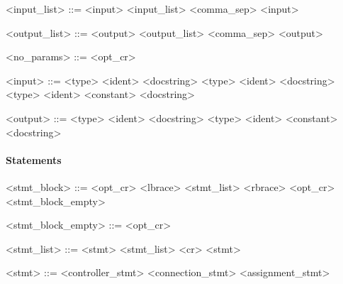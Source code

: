 \vs

\begin{grammar}
  <input_list> ::= <input>
  \alt <input_list> <comma_sep> <input>
\end{grammar}

\vs

\begin{grammar}
  <output_list> ::= <output>
  \alt <output_list> <comma_sep> <output>
\end{grammar}

\vs

\begin{grammar}
  <no_params> ::= \tn{(} <opt_cr> \tn{)}
\end{grammar}

\vs

\begin{grammar}
  <input> ::= <type> <ident> <docstring>
  \alt {} <type> <ident> <docstring>
  \alt <type> <ident>  <constant> <docstring>
\end{grammar}

\vs

\begin{grammar}
  <output> ::= <type> <ident> <docstring>
  \alt <type> <ident>  <constant> <docstring>
\end{grammar}


\paragraph{Statements}

\begin{grammar}
  <stmt_block> ::= <opt_cr> <lbrace> <stmt_list> <rbrace>
  \alt <opt_cr> <stmt_block_empty>
\end{grammar}

\vs

\begin{grammar}
  <stmt_block_empty> ::= \tn{$\{$} <opt_cr> \tn{$\}$}
\end{grammar}

\vs

\begin{grammar}
  <stmt_list> ::= <stmt>
  \alt <stmt_list> <cr> <stmt>
\end{grammar}

\vs

\begin{grammar}
  <stmt> ::= <controller_stmt>
  \alt <connection_stmt>
  \alt <assignment_stmt>
\end{grammar}

